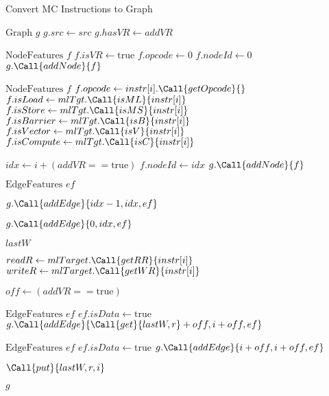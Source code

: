 \begin{algorithm}
\caption{Convert MC Instructions to Graph}
\begin{algorithmic}[1]
\small
\linespread{0.8}\selectfont
{}
    \State $\text{Graph } g$
    \State $g.src \gets src$
    \State $g.hasVR \gets addVR$
    
        \State $\text{NodeFeatures } f$
        \State $f.isVR \gets \text{true}$
        \State $f.opcode \gets 0$
        \State $f.nodeId \gets 0$
        \State $g.\Call{addNode}{f}$
    \EndIf
    
        \State $\text{NodeFeatures } f$
        \State $f.opcode \gets instr[i].\Call{getOpcode}{}$
        \State $f.isLoad \gets mlTgt.\Call{isML}{instr[i]}$
        \State $f.isStore \gets mlTgt.\Call{isMS}{instr[i]}$
        \State $f.isBarrier \gets mlTgt.\Call{isB}{instr[i]}$
        \State $f.isVector \gets mlTgt.\Call{isV}{instr[i]}$
        \State $f.isCompute \gets mlTgt.\Call{isC}{instr[i]}$
        
        \State $idx \gets i + (addVR == \text{true})$
        \State $f.nodeId \gets idx$
        \State $g.\Call{addNode}{f}$
        
        \State $\text{EdgeFeatures } ef$
        
            \State $g.\Call{addEdge}{idx-1, idx, ef}$
        \EndIf
        
            \State $g.\Call{addEdge}{0, idx, ef}$
        \EndIf
    \EndFor
    
    \State $lastW$
    
        \State $readR \gets mlTarget.\Call{getRR}{instr[i]}$
        \State $writeR \gets mlTarget.\Call{getWR}{instr[i]}$
        
            \State $off \gets (addVR == \text{true})$
            
                \State $\text{EdgeFeatures } ef$
                \State $ef.isData \gets \text{true}$
                \State $g.\Call{addEdge}{\Call{get}{lastW, r} + off, i + off, ef}$
            \EndIf
            
                \State $\text{EdgeFeatures } ef$
                \State $ef.isData \gets \text{true}$
                \State $g.\Call{addEdge}{i + off, i + off, ef}$
            \EndIf
        \EndFor
        
            \State $\Call{put}{lastW, r, i}$
        \EndFor
    \EndFor
    
    \State \Return $g$
\EndFunction
\end{algorithmic}
\end{algorithm}
